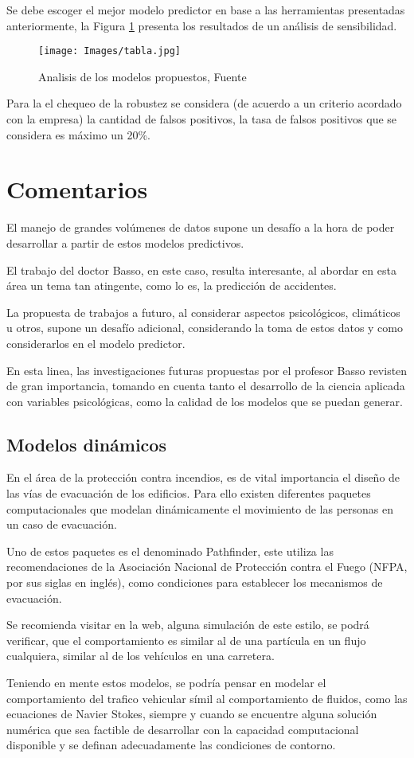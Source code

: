\documentclass{article}
\begin{document}
Se debe escoger el mejor modelo predictor en base a las herramientas presentadas anteriormente, la Figura \ref{tabla} presenta los resultados de un análisis de sensibilidad.

\begin{figure}[H]
\texttt{[image: Images/tabla.jpg]}
\centering
\caption{Analisis de los modelos propuestos, Fuente \cite{article1}}
\label{tabla}
\end{figure}


Para la el chequeo de la robustez se considera (de acuerdo a un criterio acordado con la empresa) la cantidad de falsos positivos, la tasa de falsos positivos que se considera es máximo un 20\%.

\section{Comentarios}

El manejo de grandes volúmenes de datos supone un desafío a la hora de poder desarrollar a partir de estos modelos predictivos.

El trabajo del doctor Basso, en este caso, resulta interesante, al abordar en esta área un tema tan atingente, como lo es, la predicción de accidentes.

La propuesta de trabajos a futuro, al considerar aspectos psicológicos, climáticos u otros, supone un desafío adicional, considerando la toma de estos datos y como considerarlos en el modelo predictor. 

En esta linea, las investigaciones futuras propuestas por el profesor Basso revisten de gran importancia, tomando en cuenta tanto el desarrollo de la ciencia aplicada con variables psicológicas, como la calidad de los modelos que se puedan generar.

\subsection{Modelos dinámicos}
En el área de la protección contra incendios, es de vital importancia el diseño de las vías de evacuación de los edificios. Para ello existen diferentes paquetes computacionales que modelan dinámicamente el movimiento de las personas en un caso de evacuación.

Uno de estos paquetes es el denominado Pathfinder, este utiliza las recomendaciones de la Asociación Nacional de Protección contra el Fuego (NFPA, por sus siglas en inglés), como condiciones para establecer los mecanismos de evacuación.

Se recomienda visitar en la web, alguna simulación de este estilo, se podrá verificar,  que el comportamiento es similar al de una partícula en un flujo cualquiera, similar al de los vehículos en una carretera.

Teniendo en mente estos modelos, se podría pensar en modelar el comportamiento del trafico vehicular símil al comportamiento de fluidos, como las ecuaciones de Navier Stokes, siempre y cuando se encuentre alguna solución numérica que sea factible de desarrollar con la capacidad computacional disponible y se definan adecuadamente las condiciones de contorno.


\nocite{*}
    
\end{document}
